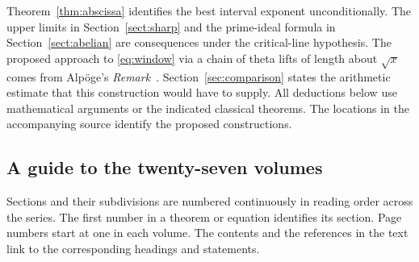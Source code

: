 \documentclass[a4paper,11pt]{article}
\theoremstyle{definition}
\theoremstyle{remark}
\numberwithin{equation}{section}
\begin{document}
 Theorem~\ref{thm:abscissa} identifies the best interval exponent unconditionally. The upper limits in Section~\ref{sect:sharp} and the prime-ideal formula in Section~\ref{sect:abelian} are consequences under the critical-line hypothesis. The proposed approach to \eqref{eq:window} via a chain of theta lifts of length about \(\sqrt x\) comes from Alp\"oge's \emph{Remark}~\cite{I-I-I-alpoge}. Section~\ref{sec:comparison} states the arithmetic estimate that this construction would have to supply. All deductions below use mathematical arguments or the indicated classical theorems. The locations in the accompanying source identify the proposed constructions.

\subsection{A guide to the twenty-seven volumes}\label{nav:I-01}
\label{seriesguide}
Sections and their subdivisions are numbered continuously in reading order across the series.
The first number in a theorem or equation identifies its section. Page numbers start at one in each volume.
The contents and the references in the text link to the corresponding headings and statements.
\par\medskip
\begingroup\small\setlength{\tabcolsep}{4pt}\renewcommand{\arraystretch}{1.12}
\end{document}
